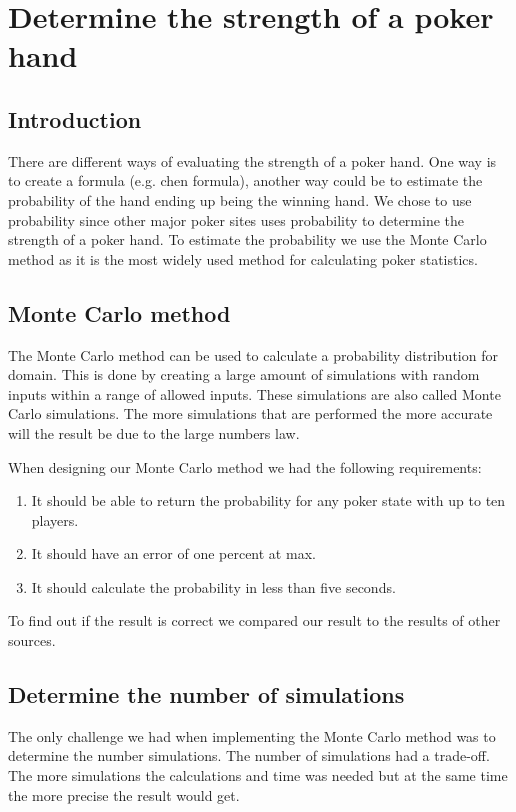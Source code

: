 \section{Determine the strength of a poker hand}

\subsection{Introduction}
There are different ways of evaluating the strength of a poker hand. One way is to create a formula (e.g. chen formula), another way could be to estimate the  probability of the hand ending up being the winning hand. We chose to use probability since other major poker sites uses probability to determine the strength of a poker hand. To estimate the probability we use the Monte Carlo method as it is the most widely used method for calculating poker statistics. 

\subsection{Monte Carlo method}
The Monte Carlo method can be used to calculate a probability distribution for domain. This is done by creating a large amount of simulations with random inputs within a range of allowed inputs. These simulations are also called Monte Carlo simulations. The more simulations that are performed the more accurate will the result be due to the large numbers law. 

When designing our Monte Carlo method we had the following requirements:
\begin{enumerate}
\item It should be able to return the probability for any poker state with up to ten players.
\item It should have an error of one percent at max.
\item It should calculate the probability in less than five seconds.
\end{enumerate}

To find out if the result is correct we compared our result to the results of other sources.

\subsection{Determine the number of simulations}
The only challenge we had when implementing the Monte Carlo method was to determine the number simulations. The number of simulations had a trade-off. The more simulations the calculations and time was needed but at the same time the more precise the result would get. 

